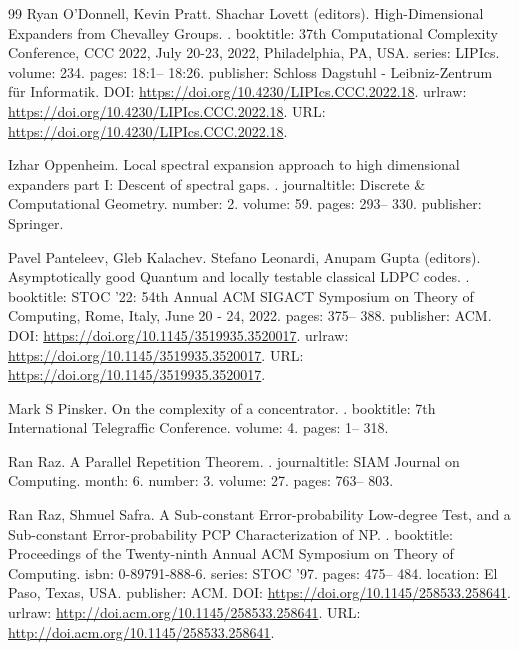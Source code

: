 \begin{thebibliography}{99}
Ryan O'Donnell, Kevin Pratt.
Shachar Lovett (editors).
\newblock High-Dimensional Expanders from Chevalley Groups.
.
\newblock booktitle: 37th Computational Complexity Conference, {CCC} 2022, July 20-23, 2022, Philadelphia, PA, {USA}.
\newblock series: LIPIcs.
\newblock volume: 234.
\newblock pages: 18:1-- 18:26.
\newblock publisher: Schloss Dagstuhl - Leibniz-Zentrum für Informatik.
\newblock DOI: \url{https://doi.org/10.4230/LIPIcs.CCC.2022.18}.
\newblock urlraw: \url{https://doi.org/10.4230/LIPIcs.CCC.2022.18}.
\newblock URL: \url{https://doi.org/10.4230/LIPIcs.CCC.2022.18}.

Izhar Oppenheim.
\newblock Local spectral expansion approach to high dimensional expanders part I: Descent of spectral gaps.
.
\newblock journaltitle: Discrete \& Computational Geometry.
\newblock number: 2.
\newblock volume: 59.
\newblock pages: 293-- 330.
\newblock publisher: Springer.

Pavel Panteleev, Gleb Kalachev.
Stefano Leonardi, Anupam Gupta (editors).
\newblock Asymptotically good Quantum and locally testable classical {LDPC} codes.
.
\newblock booktitle: {STOC} '22: 54th Annual {ACM} {SIGACT} Symposium on Theory of Computing, Rome, Italy, June 20 - 24, 2022.
\newblock pages: 375-- 388.
\newblock publisher: ACM.
\newblock DOI: \url{https://doi.org/10.1145/3519935.3520017}.
\newblock urlraw: \url{https://doi.org/10.1145/3519935.3520017}.
\newblock URL: \url{https://doi.org/10.1145/3519935.3520017}.

Mark S Pinsker.
\newblock On the complexity of a concentrator.
.
\newblock booktitle: 7th International Telegraffic Conference.
\newblock volume: 4.
\newblock pages: 1-- 318.

Ran Raz.
\newblock A Parallel Repetition Theorem.
.
\newblock journaltitle: SIAM Journal on Computing.
\newblock month: 6.
\newblock number: 3.
\newblock volume: 27.
\newblock pages: 763-- 803.

Ran Raz, Shmuel Safra.
\newblock A Sub-constant Error-probability Low-degree Test, and a Sub-constant Error-probability PCP Characterization of NP.
.
\newblock booktitle: Proceedings of the Twenty-ninth Annual ACM Symposium on Theory of Computing.
\newblock isbn: 0-89791-888-6.
\newblock series: STOC '97.
\newblock pages: 475-- 484.
\newblock location: El Paso, Texas, USA.
\newblock publisher: ACM.
\newblock DOI: \url{https://doi.org/10.1145/258533.258641}.
\newblock urlraw: \url{http://doi.acm.org/10.1145/258533.258641}.
\newblock URL: \url{http://doi.acm.org/10.1145/258533.258641}.


\end{thebibliography}
